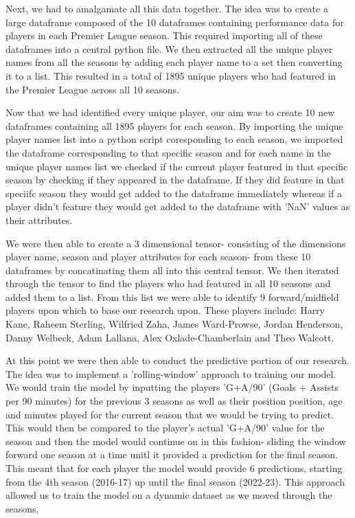 \documentclass[12pt]{article}
\begin{document}
Next, we had to amalgamate all this data together. The idea was to create a 
large dataframe composed of the 10 dataframes containing performance data for players 
in each Premier League season. This required importing all of these dataframes 
into a central python file. We then extracted all the unique player names from
all the seasons by adding each player name to a set then converting it to a list.
This resulted in a total of 1895 unique players who had featured in the Premier
League across all 10 seasons.

Now that we had identified every unique player, our aim was to create 10 new 
dataframes containing all 1895 players for each season. By importing the unique
player names list into a python script coresponding to each season, we imported 
the dataframe corresponding to that specific season and for each name in the 
unique player names list we checked if the current player featured in that specific 
season by checking if they appeared in the dataframe. If they did feature in that 
speciifc season they would get added to the dataframe immediately whereas if a 
player didn't feature they would get added to the dataframe with 'NaN' values 
as their attributes. 

We were then able to create a 3 dimensional tensor- consisting of the dimensions 
player name, season and player attributes for each season- from these 10 dataframes
by concatinating them all into this central tensor. 
We then iterated through the tensor to find the players who had featured in all 
10 seasons and added them to a list. From this list we were able to identify 
9 forward/midfield players upon which to base our research upon. These players 
include:
Harry Kane, Raheem Sterling, Wilfried Zaha,
James Ward-Prowse, Jordan Henderson, Danny Welbeck,
Adam Lallana, Alex Oxlade-Chamberlain and Theo Walcott.

At this point we were then able to conduct the predictive portion of our research.
The idea was to implement a 'rolling-window' approach to training our model. 
We would train the model by inputting the players 'G+A/90' (Goals + Assists per 
90 minutes) for the previous 3 seasons as well as their position position, age 
and minutes played for the current season that we would be trying to predict.
This would then be compared to the player's actual 'G+A/90' value for the season
and then the model would continue on in this fashion- sliding the window 
forward one season at a time unitl it provided a prediction 
for the final season.
This meant that for each player the model would provide 6 predictions, starting
from the 4th season (2016-17) up until the final season (2022-23). This approach 
allowed us to train the model on a dynamic dataset as we moved through the seasons.
\end{document}
